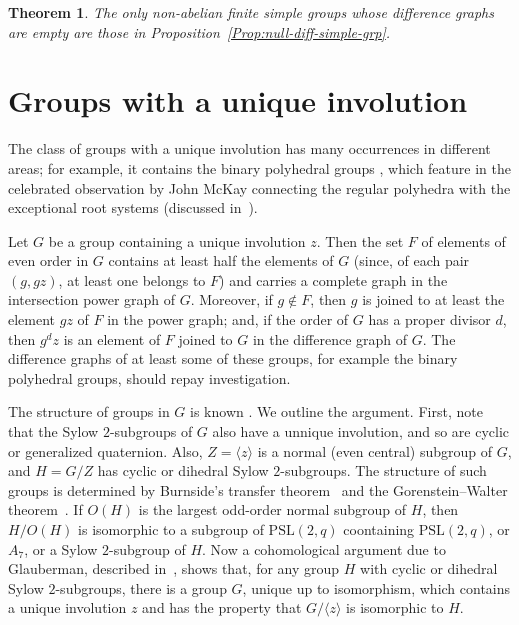\documentclass[12pt]{amsart}
\theoremstyle{plain}
\newtheorem{theorem}{Theorem}[section]
\theoremstyle{remark}
\theoremstyle{definition}
\begin{document}
\begin{theorem}\label{t:null-diff-graph-simple-grp}
The only non-abelian finite simple groups whose difference graphs are empty
are those in Proposition~\ref{Prop:null-diff-simple-grp}.
\end{theorem}

\section{Groups with a unique involution}
\label{sec:grp-with-unique-involution}

The class of groups with a unique involution has many occurrences in different
areas; for example, it contains the binary polyhedral groups
\cite[p. 82]{coxeter}, which feature in the celebrated observation by John
McKay connecting the regular polyhedra with the exceptional root systems
(discussed in~\cite[pp. 109f]{ade}).

Let $G$ be a group containing a unique involution $z$. Then the set $F$ of
elements of even order in $G$ contains at least half the elements of $G$
(since, of each pair $(g,gz)$, at least one belongs to $F$) and carries a
complete graph in the intersection power graph of $G$. Moreover, if $g\notin F$,
then $g$ is joined to at least the element $gz$ of $F$ in the power graph;
and, if the order of $G$ has a proper divisor $d$, then $g^dz$ is an element of
$F$ joined to $G$ in the difference graph of $G$. The difference graphs of at
least some of these groups, for example the binary polyhedral groups, should
repay investigation.

The structure of groups in $G$ is known \cite{bc}. We outline the argument.
First, note that the Sylow $2$-subgroups of $G$ also have a unnique involution,
and so are cyclic or generalized quaternion. Also, $Z=\langle z\rangle$ is a
normal (even central) subgroup of $G$, and $H=G/Z$ has cyclic or dihedral Sylow
$2$-subgroups. The structure of such groups is determined by Burnside's
transfer theorem~\cite[p. 155]{burnside} and the Gorenstein--Walter
theorem~\cite{gw}. If $O(H)$ is the largest odd-order normal subgroup of $H$,
then $H/O(H)$ is isomorphic to a subgroup of $\mathrm{PSL}(2,q)$
coontaining $\mathrm{PSL}(2,q)$, or $A_7$, or a Sylow $2$-subgroup of $H$.
Now a cohomological argument due to Glauberman, described in~\cite{bc}, shows
that, for any group $H$ with cyclic or dihedral Sylow $2$-subgroups, there is
a group $G$, unique up to isomorphism, which contains a unique involution $z$ 
and has the property that $G/\langle z\rangle$ is isomorphic to $H$.
\end{document}
